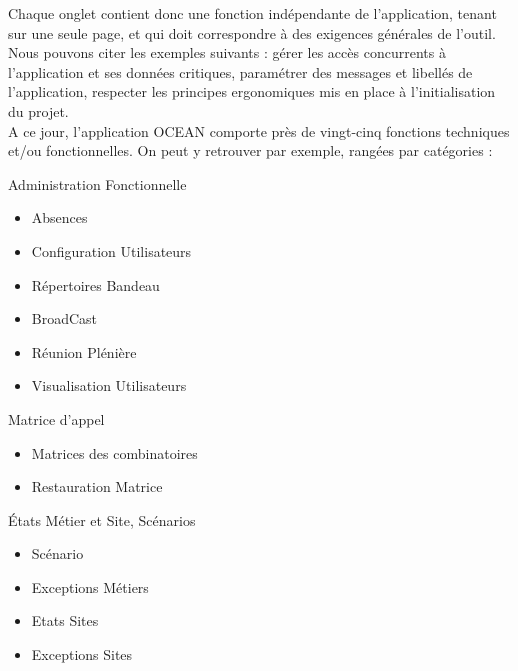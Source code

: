 \documentclass{rapport}
\begin{document}
Chaque onglet contient donc une fonction indépendante de l'application, tenant sur une seule page, et qui doit correspondre à des exigences générales de l'outil. Nous pouvons citer les exemples suivants : gérer les accès concurrents à l'application et ses données critiques, paramétrer des messages et libellés de l'application, respecter les principes ergonomiques mis en place à l'initialisation du projet.\\

A ce jour, l'application OCEAN comporte près de vingt-cinq fonctions techniques et/ou fonctionnelles. On peut y retrouver par exemple, rangées par catégories :

\vspace{5mm} %
\begin{itemize}

\begin{minipage}{0.5\textwidth}
\item Administration Fonctionnelle
        \begin{itemize}
        \item Absences
        \item Configuration Utilisateurs
        \item Répertoires Bandeau
        \item BroadCast
        \item Réunion Plénière
        \item Visualisation Utilisateurs
        \end{itemize}
    \vspace{5mm} %
    \item Matrice d'appel
        \begin{itemize}
        \item Matrices des combinatoires
        \item Restauration Matrice
        \end{itemize}
    \vspace{5mm} %
    \item États Métier et Site, Scénarios
        \begin{itemize}
        \item Scénario
        \item Exceptions Métiers
        \item Etats Sites
        \item Exceptions Sites
        \end{itemize}
\end{minipage}

\end{itemize}
\end{document}
